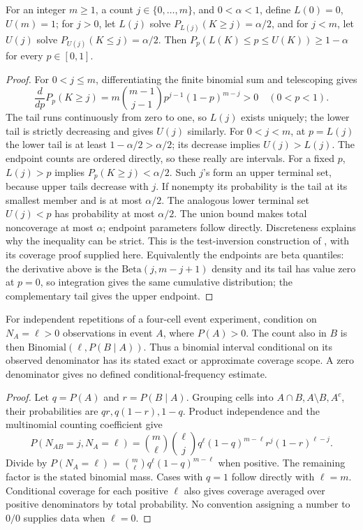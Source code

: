 \begin{proposition}
\label{sm:clopper-pearson}
For an integer \(m\geq1\), a count \(j\in\{0,\ldots,m\}\), and
\(0<\alpha<1\), define \(L(0)=0\), \(U(m)=1\); for \(j>0\),
let \(L(j)\) solve \(P_{L(j)}(K\geq j)=\alpha/2\), and for \(j<m\),
let \(U(j)\) solve \(P_{U(j)}(K\leq j)=\alpha/2\). Then
\(P_p(L(K)\leq p\leq U(K))\geq1-\alpha\) for every \(p\in[0,1]\).
\end{proposition}
\begin{proof}
For \(0<j\leq m\), differentiating the finite binomial sum and
telescoping gives
\[
 \frac{d}{dp}P_p(K\geq j)
 =m\binom{m-1}{j-1}p^{j-1}(1-p)^{m-j}>0\quad(0<p<1).
\]
The tail runs continuously from zero to one, so \(L(j)\) exists uniquely;
the lower tail is strictly decreasing and gives \(U(j)\) similarly.
For \(0<j<m\), at \(p=L(j)\) the lower tail is at least
\(1-\alpha/2>\alpha/2\); its decrease implies \(U(j)>L(j)\).
The endpoint counts are ordered directly, so these really are intervals.
For a fixed \(p\), \(L(j)>p\) implies \(P_p(K\geq j)<\alpha/2\).
Such \(j\)'s form an upper terminal set, because upper tails decrease
with \(j\). If nonempty its probability is the tail at its smallest
member and is at most \(\alpha/2\). The analogous lower terminal set
\(U(j)<p\) has probability at most \(\alpha/2\). The union bound makes
total noncoverage at most \(\alpha\); endpoint parameters follow directly.
Discreteness explains why the inequality can be strict. This is the
test-inversion construction of \citet{clopper1934}, with its coverage
proof supplied here. Equivalently the endpoints are beta quantiles:
the derivative above is the \(\mathrm{Beta}(j,m-j+1)\) density and its
tail has value zero at \(p=0\), so integration gives the same cumulative
distribution; the complementary tail gives the upper endpoint.
\end{proof}

\begin{proposition}
\label{sm:conditional-count}
For independent repetitions of a four-cell event experiment, condition on
\(N_A=\ell>0\) observations in event \(A\), where \(P(A)>0\).
The count also in \(B\) is then \(\mathrm{Binomial}(\ell,P(B\mid A))\).
Thus a binomial interval conditional on its observed denominator has its
stated exact or approximate coverage scope. A zero denominator gives no
defined conditional-frequency estimate.
\end{proposition}
\begin{proof}
Let \(q=P(A)\) and \(r=P(B\mid A)\). Grouping cells into
\(A\cap B,A\setminus B,A^c\), their probabilities are
\(qr,q(1-r),1-q\). Product independence and the multinomial counting
coefficient give
\[
 P(N_{AB}=j,N_A=\ell)
 =\binom m\ell\binom\ell j q^\ell(1-q)^{m-\ell}
           r^j(1-r)^{\ell-j}.
\]
Divide by \(P(N_A=\ell)=\binom m\ell q^\ell(1-q)^{m-\ell}\)
when positive. The remaining factor is the stated binomial mass. Cases
with \(q=1\) follow directly with \(\ell=m\). Conditional coverage for
each positive \(\ell\) also gives coverage averaged over positive
denominators by total probability. No convention assigning a number to
\(0/0\) supplies data when \(\ell=0\).
\end{proof}

